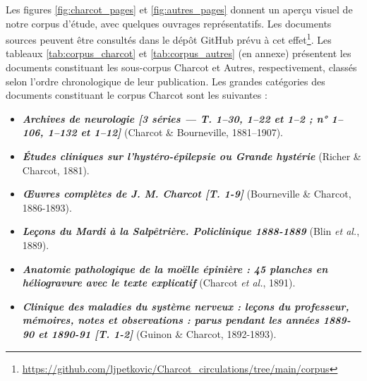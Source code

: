 Les figures \ref{fig:charcot_pages} et \ref{fig:autres_pages} donnent un aperçu visuel de notre corpus d'étude, avec quelques ouvrages représentatifs. Les documents sources peuvent être consultés dans le dépôt GitHub prévu à cet effet\footnote{\url{https://github.com/ljpetkovic/Charcot_circulations/tree/main/corpus}}. Les tableaux \ref{tab:corpus_charcot} et \ref{tab:corpus_autres} (en annexe) présentent les documents constituant les sous-corpus Charcot et Autres, respectivement, classés selon l'ordre chronologique de leur publication. Les grandes catégories des documents constituant le corpus \og{}Charcot\fg{} sont les suivantes :
\begin{itemize}
	\item \textit{\textbf{Archives de neurologie [3 séries — T. 1–30, 1–22 et 1–2 ; n° 1–106, 1–132 et 1–12]}} (Charcot \& Bourneville, 1881–1907).
	\item \textit{\textbf{Études cliniques sur l'hystéro-épilepsie ou Grande hystérie}} (Richer \& Charcot, 1881).
	\item \textit{\textbf{\OE{}uvres complètes de J. M. Charcot [T. 1-9]}} (Bourneville \& Charcot, 1886-1893). 
	\item \textbf{\textit{Leçons du Mardi à la Salpêtrière. Policlinique 1888-1889}} (Blin \textit{et al.}, 1889).
	\item \textbf{\textit{Anatomie pathologique de la moëlle épinière : 45 planches en héliogravure avec le texte explicatif}} (Charcot \textit{et al.}, 1891).
	\item \textbf{\textit{Clinique des maladies du système nerveux : leçons du professeur, mémoires, notes et observations : parus pendant les années 1889-90 et 1890-91 [T. 1-2]}} (Guinon \& Charcot, 1892-1893).
\end{itemize}

